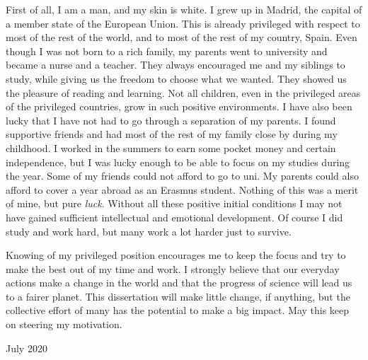 First of all, I am a man, and my skin is white. I grew up in Madrid, the capital of a member state of the European Union. This is already privileged with respect to most of the rest of the world, and to most of the rest of my country, Spain. Even though I was not born to a rich family, my parents went to university and became a nurse and a teacher. They always encouraged me and my siblings to study, while giving us the freedom to choose what we wanted. They showed us the pleasure of reading and learning. Not all children, even in the privileged areas of the privileged countries, grow in such positive environments. I have also been lucky that I have not had to go through a separation of my parents. I found supportive friends and had most of the rest of my family close by during my childhood. I worked in the summers to earn some pocket money and certain independence, but I was lucky enough to be able to focus on my studies during the year. Some of my friends could not afford to go to uni. My parents could also afford to cover a year abroad as an Erasmus student. Nothing of this was a merit of mine, but pure \textit{luck}. Without all these positive initial conditions I may not have gained sufficient intellectual and emotional development. Of course I did study and work hard, but many work a lot harder just to survive.

Knowing of my privileged position encourages me to keep the focus and try to make the best out of my time and work. I strongly believe that our everyday actions make a change in the world and that the progress of science will lead us to a fairer planet. This dissertation will make little change, if anything, but the collective effort of many has the potential to make a big impact. May this keep on steering my motivation.
\begin{flushright}
\vspace{5pt}
July 2020
\end{flushright}
\vspace*{\fill}
\endgroup
